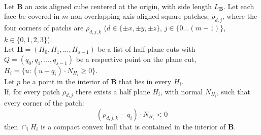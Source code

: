 \documentclass[a4paper,fleqn]{cas-dc}
\begin{document}


\begin{theorem}
  \label{thm:cubeConvexHull}
  \ \\
  Let $\mathbf{B}$ an axis aligned cube centered at the origin, with side length $L _ {\mathbf{B}}$.
  Let each face be covered in $m$ non-overlapping axis aligned
  square patches, $\rho _ {d,j}$, where the four corners of patchs are
  $\rho _ {d,j,k}$ ($d \in \{ \pm x, \pm y, \pm z \}$, $j \in \{0 \dots (m-1)\}$, $k \in \{0,1,2,3\}$). \\
  Let $\mathbf{H} = (H _ 0, H _ 1, \dots, H _ {s-1})$ be a list of half plane cuts with
  $Q = (q _ 0, q _ 1, \dots, q _ {s-1})$ be a respective point on the plane cut,
  $H _ i = \{ u : (u - q _ i) \cdot N _ {H _ i} \ge 0 \}$. \\
  Let $p$ be a point in the interior of $\mathbf{B}$ that lies in every $H _ i$. \\
  If, for every patch $\rho _ {d,j}$ there exists a half plane $H _ i$, with normal $N _ {H _ i}$,
  such that every corner of the patch: \\ %
  $$
  (\rho _ {d,j,k} - q _ i) \cdot N _ {H _ i} < 0
  $$
  then $\cap _ i H _ i$ is a compact convex hull that is contained in the interior of $\mathbf{B}$.

\end{theorem}
\end{document}

